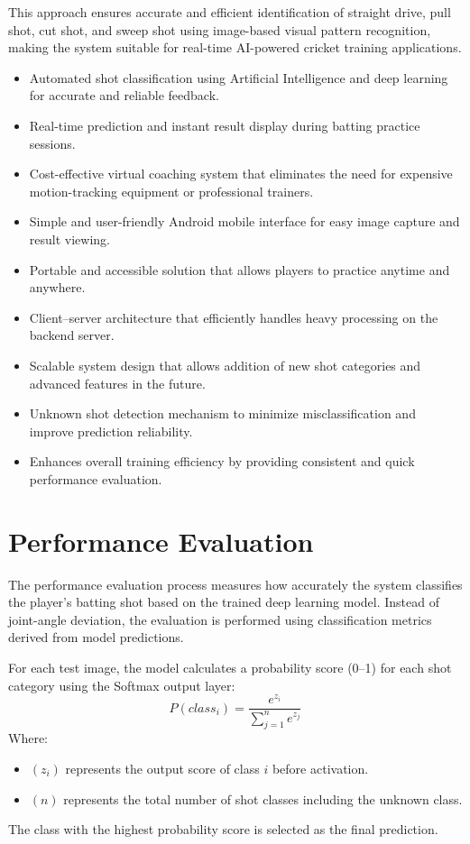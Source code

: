 This approach ensures accurate and efficient identification of straight drive, pull shot, cut shot, and sweep shot using image-based visual pattern recognition, making the system suitable for real-time AI-powered cricket training applications.
\begin{itemize}
	\item Automated shot classification using Artificial Intelligence and deep learning for accurate and reliable feedback.
	\item Real-time prediction and instant result display during batting practice sessions.
	\item Cost-effective virtual coaching system that eliminates the need for expensive motion-tracking equipment or professional trainers.
	\item Simple and user-friendly Android mobile interface for easy image capture and result viewing.
	\item Portable and accessible solution that allows players to practice anytime and anywhere.
	\item Client–server architecture that efficiently handles heavy processing on the backend server.
	\item Scalable system design that allows addition of new shot categories and advanced features in the future.
	\item Unknown shot detection mechanism to minimize misclassification and improve prediction reliability.
	\item Enhances overall training efficiency by providing consistent and quick performance evaluation.
\end{itemize}

\section{Performance Evaluation} \label{S4.7}
The performance evaluation process measures how accurately the system classifies the player’s batting shot based on the trained deep learning model. Instead of joint-angle deviation, the evaluation is performed using classification metrics derived from model predictions.

For each test image, the model calculates a probability score (0–1) for each shot category using the Softmax output layer:
\[
P(class_i) = \frac{e^{z_i}}{\sum_{j=1}^{n} e^{z_j}}
\]
Where:
\begin{itemize}
	\item $(z_i)$ represents the output score of class $i$ before activation.
	\item $(n)$ represents the total number of shot classes including the unknown class.
\end{itemize}
The class with the highest probability score is selected as the final prediction.


